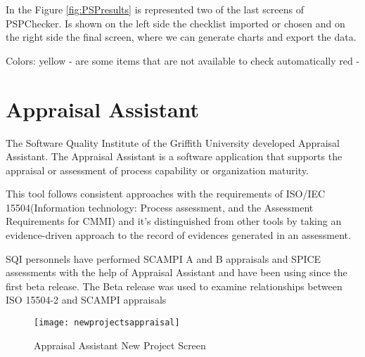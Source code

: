 In the Figure \ref{fig:PSPresults} is represented two of the last screens of PSPChecker. Is shown on the left side the checklist imported or chosen and on the right side the final screen, where we can generate charts and export the data.

Colors: yellow - are some items that are not available to check automatically 
red - 

\section{Appraisal Assistant}

The Software Quality Institute of the Griffith University\citep{SoftwareQuality2015} developed Appraisal Assistant. The Appraisal Assistant\citep{Appraisal2015} is a software application that supports the appraisal or assessment of process capability or organization maturity.

This tool follows consistent approaches with the requirements of ISO/IEC 15504(Information technology: Process assessment, and the Assessment Requirements for CMMI)\citep{ISOIEC} and it's distinguished from other tools by taking an evidence-driven approach to the record of evidences generated in an assessment.

SQI personnels have performed SCAMPI A and B appraisals and SPICE assessments with the help of Appraisal Assistant and have been using since the first beta release. The Beta release was used to examine relationships between ISO 15504-2 and SCAMPI appraisals

\begin{figure}[h]
	\begin{center}
		\leavevmode
		\texttt{[image: newprojectsappraisal]}
		\caption{Appraisal Assistant New Project Screen}
		\label{fig:newprojectsappraisal}
	\end{center}
\end{figure}

